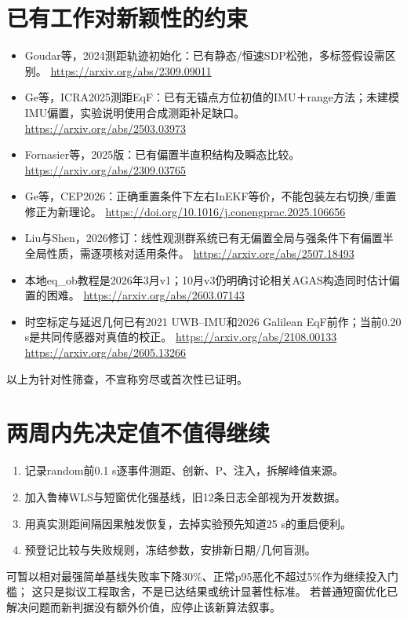 \documentclass[11pt,a4paper]{ctexart}
\begin{document}
\clearpage
\section{已有工作对新颖性的约束}
\begin{itemize}
\item Goudar等，2024测距轨迹初始化：已有静态/恒速SDP松弛，多标签假设需区别。\newline
\url{https://arxiv.org/abs/2309.09011}
\item Ge等，ICRA2025测距EqF：已有无锚点方位初值的IMU＋range方法；未建模IMU偏置，实验说明使用合成测距补足缺口。\newline
\url{https://arxiv.org/abs/2503.03973}
\item Fornasier等，2025版：已有偏置半直积结构及瞬态比较。\newline
\url{https://arxiv.org/abs/2309.03765}
\item Ge等，CEP2026：正确重置条件下左右InEKF等价，不能包装左右切换/重置修正为新理论。\newline
\url{https://doi.org/10.1016/j.conengprac.2025.106656}
\item Liu与Shen，2026修订：线性观测群系统已有无偏置全局与强条件下有偏置半全局性质，需逐项核对适用条件。\newline
\url{https://arxiv.org/abs/2507.18493}
\item 本地eq\_ob教程是2026年3月v1；10月v3仍明确讨论相关AGAS构造同时估计偏置的困难。\newline
\url{https://arxiv.org/abs/2603.07143}
\item 时空标定与延迟几何已有2021 UWB--IMU和2026 Galilean EqF前作；当前0.20 s是共同传感器对真值的校正。\newline
\url{https://arxiv.org/abs/2108.00133}\quad
\url{https://arxiv.org/abs/2605.13266}
\end{itemize}
以上为针对性筛查，不宣称穷尽或首次性已证明。

\section{两周内先决定值不值得继续}
\begin{enumerate}
\item 记录random前0.1 s逐事件测距、创新、P、注入，拆解峰值来源。
\item 加入鲁棒WLS与短窗优化强基线，旧12条日志全部视为开发数据。
\item 用真实测距间隔因果触发恢复，去掉实验预先知道25 s的重启便利。
\item 预登记比较与失败规则，冻结参数，安排新日期/几何盲测。
\end{enumerate}
可暂以相对最强简单基线失败率下降30\%、正常p95恶化不超过5\%作为继续投入门槛；
这只是拟议工程取舍，不是已达结果或统计显著性标准。
若普通短窗优化已解决问题而新判据没有额外价值，应停止该新算法叙事。
\end{document}
